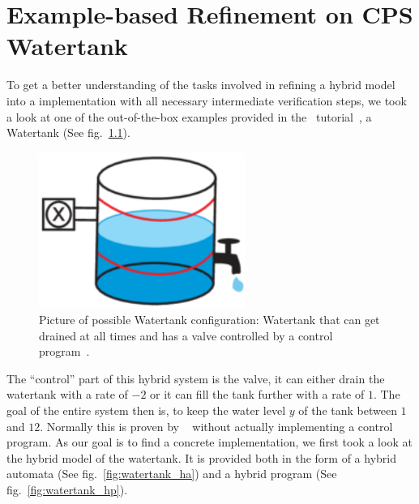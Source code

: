 


\chapter{Example-based Refinement on CPS Watertank}
\label{ch:Watertank}

To get a better understanding of the tasks involved in refining a hybrid model into a implementation with all necessary intermediate verification steps, we took a look at one of the out-of-the-box examples provided in the \keym~tutorial~\cite{keYmaera}, a Watertank (See fig.~\ref{fig:watertank}).

\begin{figure}
	\setcounter{figure}{0}
	\centering
	\includegraphics[width=0.6\textwidth]{images/watertank}
	\caption{Picture of possible Watertank configuration: Watertank that can get drained at all times and has a valve controlled by a control program~\cite{keymaeraGuide}.}
	\label{fig:watertank}
\end{figure}

The ``control'' part of this hybrid system is the valve, it can either drain the watertank with a rate of \(-2\) or it can fill the tank further with a rate of \(1\). The goal of the entire system then is, to keep the water level \(y\) of the tank between \(1\) and \(12\). Normally this is proven by \keym~ without actually implementing a control program. As our goal is to find a concrete implementation,  we first took a look at the hybrid model of the watertank. It is provided both in the form of a hybrid automata (See fig.~\ref{fig:watertank_ha}) and a hybrid program (See fig.~\ref{fig:watertank_hp}).

